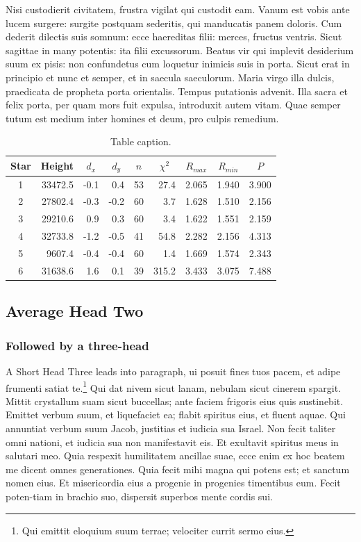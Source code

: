 \documentclass{bln}
\begin{document}
Nisi custodierit civitatem, frustra vigilat qui custodit eam. Vanum
est vobis ante lucem surgere: surgite postquam sederitis, qui
manducatis panem doloris. Cum dederit dilectis suis somnum: ecce
haereditas filii: merces, fructus ventris. Sicut sagittae in many
potentis: ita filii excussorum. Beatus vir qui implevit desiderium
suum ex pisis: non confundetus cum loquetur inimicis suis in porta.
Sicut erat in principio et nunc et semper, et in saecula saeculorum.
Maria virgo illa dulcis, praedicata de propheta porta orientalis.
Tempus putationis advenit.  Illa sacra et felix porta, per quam mors
fuit expulsa, introduxit autem vitam.  Quae semper tutum est medium
inter homines et deum, pro culpis remedium.


\begin{table}
\caption{Table caption.}\label{tbl-2}
\begin{tabular*}{\textwidth}{@{\extracolsep{\fill}}crrrrrrrr@{}}
\hline
Star & Height & \multicolumn{1}{c}{$d_{x}$} &
\multicolumn{1}{c}{$d_{y}$} &
\multicolumn{1}{c}{$n$} &
\multicolumn{1}{c}{$\chi^2$} &
\multicolumn{1}{c}{$R_{max}$} &
\multicolumn{1}{c}{$R_{min}$} &
\multicolumn{1}{c}{$P$}  \\
\hline
1 &33472.5 &-0.1 &0.4  &53 &27.4  &2.065  &1.940 &3.900\\
2 &27802.4 &-0.3 &-0.2 &60 &3.7   &1.628  &1.510 &2.156\\
3 &29210.6 &0.9  &0.3  &60 &3.4   &1.622  &1.551 &2.159\\
4 &32733.8 &-1.2 &-0.5 &41 &54.8  &2.282  &2.156 &4.313\\
5 & 9607.4 &-0.4 &-0.4 &60 &1.4   &1.669  &1.574 &2.343\\
6 &31638.6 &1.6  &0.1  &39 &315.2 & 3.433 &3.075 &7.488\\
\hline
\end{tabular*}
\end{table}


\subsection{Average Head Two}

\subsubsection{Followed by a three-head}

A Short Head Three leads into paragraph, ui posuit fines tuos pacem,
et adipe frumenti satiat te.\footnote{Qui emittit eloquium suum terrae;
velociter currit sermo eius.} Qui dat nivem sicut lanam, nebulam
sicut cinerem spargit. Mittit crystallum suam sicut buccellas; ante
faciem frigoris eius quis sustinebit. Emittet verbum suum, et
liquefaciet ea; flabit spiritus eius, et fluent aquae. Qui annuntiat
verbum suum Jacob, justitias et iudicia sua Israel. Non fecit taliter omni
nationi, et iudicia sua non manifestavit eis. Et exultavit spiritus meus
in salutari meo.  Quia respexit humilitatem ancillae suae, ecce enim ex
hoc beatem me dicent omnes generationes. Quia fecit mihi magna qui potens
est; et sanctum nomen eius. Et misericordia eius a progenie in progenies
timentibus eum. Fecit poten-tiam in brachio suo, dispersit superbos mente
cordis sui.
\end{document}
